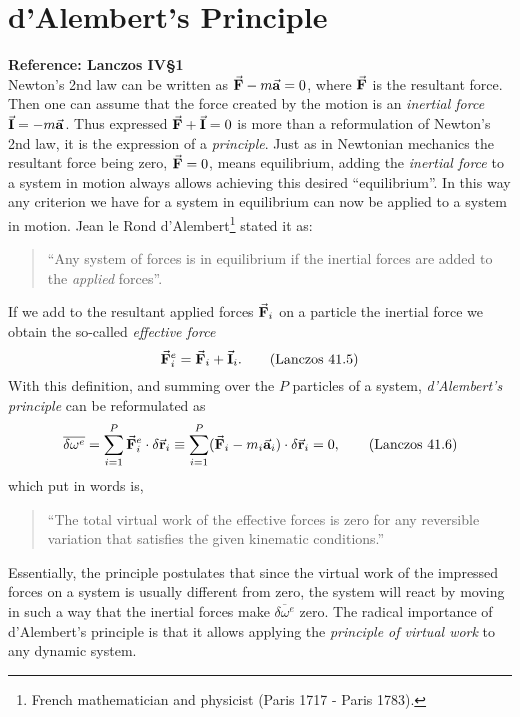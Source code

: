 \documentclass[12pt, spanish, a4paper, ]{article}
\begin{document}
\section{d'Alembert's Principle}
\textbf{Reference: Lanczos IV\S1}\\
Newton's 2nd law can be written as \(\va{F}- m \va{a}= 0 \), where \(\va{F}\) is the resultant force.
Then one can assume that the force created by the motion is an \emph{inertial force} \(\va{I}= - m \va{a}\).
Thus expressed \(\va{F}+ \va{I}=0\) is more than a reformulation of Newton's 2nd law, it is the expression of a \emph{principle}.
Just as in Newtonian mechanics the resultant force being zero, \(\va{F}=0\), means equilibrium, adding the \emph{inertial force} to a system in motion always allows achieving this desired ``equilibrium''.
In this way any criterion we have for a system in equilibrium can now be applied to a system in motion.
Jean le Rond d'Alembert\footnote{French mathematician and physicist (Paris 1717 - Paris 1783).} stated it as:
\begin{quote}
``Any system of forces is in equilibrium if the inertial forces are added to the \emph{applied} forces''.
\end{quote}
If we add to the resultant applied forces \(\va{F}_i\) on a particle the inertial force we obtain the so-called \emph{effective force}
\begin{equation}\label{Lanczos41.5}
 \va{F}^e_i= \va{F}_i + \va{I}_i.
 \tag{Lanczos 41.5}
\end{equation}
With this definition, and summing over the \(P\) particles of a system, \emph{d'Alembert's principle} can be reformulated as
\begin{equation}\label{Lanczos41.6}
 \overline {\delta \omega^e} =
 \displaystyle\sum_{i=1}^P \va{F}^e_i \cdot \delta \va{r}_i \equiv
 \displaystyle\sum_{i=1}^P (\va{F}_i - m_i \va{a}_i) \cdot \delta \va{r}_i = 0,
 \tag{Lanczos 41.6}
\end{equation}
which put in words is,
\begin{quote}
 ``The total virtual work of the effective forces is zero for any reversible variation that satisfies the given kinematic conditions.''
\end{quote}
Essentially, the principle postulates that since the virtual work of the impressed forces on a system is usually different from zero, the system will react by moving in such a way that the inertial forces make \(\overline {\delta \omega^e}\) zero.
The radical importance of d'Alembert's principle is that it allows applying the \emph{principle of virtual work} to any dynamic system.
\end{document}
